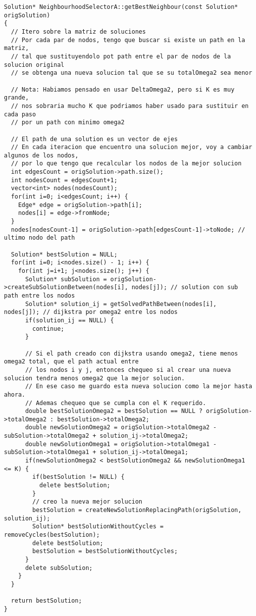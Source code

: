 \begin{lstlisting}[caption=NeighbourhoodSelectorA::getBestNeighbour()]
Solution* NeighbourhoodSelectorA::getBestNeighbour(const Solution* origSolution)
{ 
  // Itero sobre la matriz de soluciones
  // Por cada par de nodos, tengo que buscar si existe un path en la matriz, 
  // tal que sustituyendolo pot path entre el par de nodos de la solucion original 
  // se obtenga una nueva solucion tal que se su totalOmega2 sea menor
  
  // Nota: Habiamos pensado en usar DeltaOmega2, pero si K es muy grande,
  // nos sobraria mucho K que podriamos haber usado para sustituir en cada paso
  // por un path con minimo omega2                
  
  // El path de una solution es un vector de ejes   
  // En cada iteracion que encuentro una solucion mejor, voy a cambiar algunos de los nodos, 
  // por lo que tengo que recalcular los nodos de la mejor solucion             
  int edgesCount = origSolution->path.size();
  int nodesCount = edgesCount+1;
  vector<int> nodes(nodesCount); 
  for(int i=0; i<edgesCount; i++) {
    Edge* edge = origSolution->path[i];
    nodes[i] = edge->fromNode;
  }
  nodes[nodesCount-1] = origSolution->path[edgesCount-1]->toNode; // ultimo nodo del path
      
  Solution* bestSolution = NULL;  
  for(int i=0; i<nodes.size() - 1; i++) {    
    for(int j=i+1; j<nodes.size(); j++) {           
      Solution* subSolution = origSolution->createSubSolutionBetween(nodes[i], nodes[j]); // solution con sub path entre los nodos            
      Solution* solution_ij = getSolvedPathBetween(nodes[i], nodes[j]); // dijkstra por omega2 entre los nodos
      if(solution_ij == NULL) {
        continue;
      }      
      
      // Si el path creado con dijkstra usando omega2, tiene menos omega2 total, que el path actual entre
      // los nodos i y j, entonces chequeo si al crear una nueva solucion tendra menos omega2 que la mejor solucion.
      // En ese caso me guardo esta nueva solucion como la mejor hasta ahora.
      // Ademas chequeo que se cumpla con el K requerido.                          
      double bestSolutionOmega2 = bestSolution == NULL ? origSolution->totalOmega2 : bestSolution->totalOmega2;
      double newSolutionOmega2 = origSolution->totalOmega2 - subSolution->totalOmega2 + solution_ij->totalOmega2;
      double newSolutionOmega1 = origSolution->totalOmega1 - subSolution->totalOmega1 + solution_ij->totalOmega1;            
      if(newSolutionOmega2 < bestSolutionOmega2 && newSolutionOmega1 <= K) {                     
        if(bestSolution != NULL) {
          delete bestSolution;   
        }       
        // creo la nueva mejor solucion        
        bestSolution = createNewSolutionReplacingPath(origSolution, solution_ij);           
        Solution* bestSolutionWithoutCycles = removeCycles(bestSolution);                         
        delete bestSolution;
        bestSolution = bestSolutionWithoutCycles;        
      }      
      delete subSolution;
    }
  }
    
  return bestSolution;  
}
\end{lstlisting}
